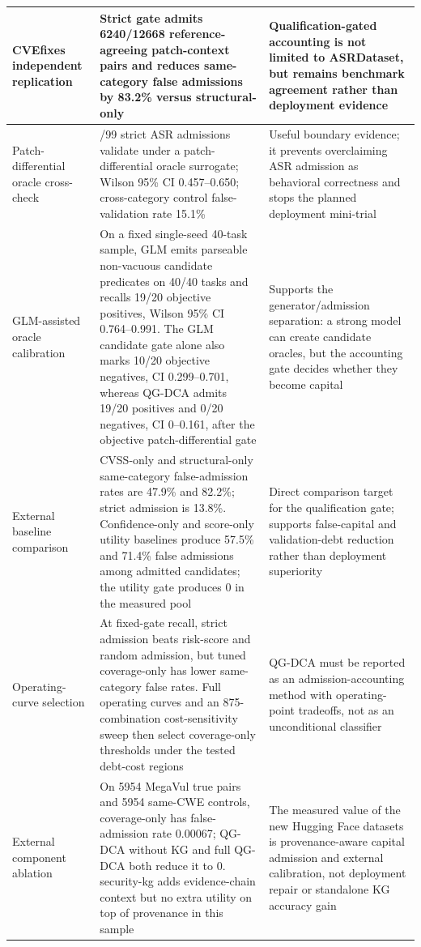 ﻿\documentclass[lettersize,journal]{IEEEtran}
\begin{document}
\begin{table}[!t]
{\begin{tabular}{|>{\raggedright\arraybackslash}p{1.35in}|>{\raggedright\arraybackslash}p{2.25in}|>{\raggedright\arraybackslash}p{2.7in}|}
\hline
CVEfixes independent replication & Strict gate admits 6240/12668 reference-agreeing patch-context pairs and reduces same-category false admissions by 83.2\% versus structural-only & Qualification-gated accounting is not limited to ASRDataset, but remains benchmark agreement rather than deployment evidence \\
\hline
Patch-differential oracle cross-check & 55/99 strict ASR admissions validate under a patch-differential oracle surrogate; Wilson 95\% CI 0.457--0.650; cross-category control false-validation rate 15.1\% & Useful boundary evidence; it prevents overclaiming ASR admission as behavioral correctness and stops the planned deployment mini-trial \\
\hline
GLM-assisted oracle calibration & On a fixed single-seed 40-task sample, GLM emits parseable non-vacuous candidate predicates on 40/40 tasks and recalls 19/20 objective positives, Wilson 95\% CI 0.764--0.991. The GLM candidate gate alone also marks 10/20 objective negatives, CI 0.299--0.701, whereas QG-DCA admits 19/20 positives and 0/20 negatives, CI 0--0.161, after the objective patch-differential gate & Supports the generator/admission separation: a strong model can create candidate oracles, but the accounting gate decides whether they become capital \\
\hline
External baseline comparison & CVSS-only and structural-only same-category false-admission rates are 47.9\% and 82.2\%; strict admission is 13.8\%. Confidence-only and score-only utility baselines produce 57.5\% and 71.4\% false admissions among admitted candidates; the utility gate produces 0 in the measured pool & Direct comparison target for the qualification gate; supports false-capital and validation-debt reduction rather than deployment superiority \\
\hline
Operating-curve selection & At fixed-gate recall, strict admission beats risk-score and random admission, but tuned coverage-only has lower same-category false rates. Full operating curves and an 875-combination cost-sensitivity sweep then select coverage-only thresholds under the tested debt-cost regions & QG-DCA must be reported as an admission-accounting method with operating-point tradeoffs, not as an unconditional classifier \\
\hline
External component ablation & On 5954 MegaVul true pairs and 5954 same-CWE controls, coverage-only has false-admission rate 0.00067; QG-DCA without KG and full QG-DCA both reduce it to 0. security-kg adds evidence-chain context but no extra utility on top of provenance in this sample & The measured value of the new Hugging Face datasets is provenance-aware capital admission and external calibration, not deployment repair or standalone KG accuracy gain \\

\end{tabular}}
\end{table}
\end{document}
